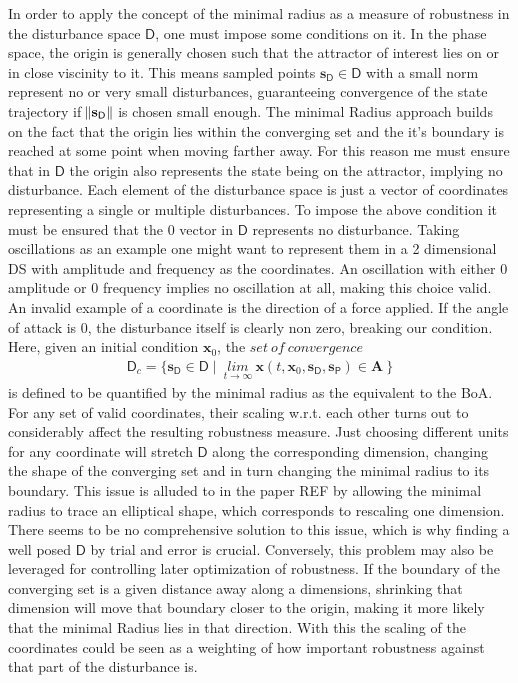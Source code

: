     In order to apply the concept of the minimal radius as a measure of robustness in the disturbance space $\mathsf{D}$, one must impose some conditions on it.
    In the phase space, the origin is generally chosen such that the attractor of interest lies on or in close viscinity to it. This means sampled points $\mathbf{s}_{\mathsf{D}} \in \mathsf{D}$ with a small norm represent no or very small disturbances, guaranteeing convergence of the state trajectory if $\norm{\mathbf{s}_{\mathsf{D}}}$ is chosen small enough. The minimal Radius approach builds on the fact that the origin lies within the converging set and the it's boundary is reached at some point when moving farther away. 
    For this reason me must ensure that in $\mathsf{D}$ the origin also represents the state being on the attractor, implying no disturbance.
    Each element of the disturbance space is just a vector of coordinates representing a single or multiple disturbances. To impose the above condition it must be ensured that the 0 vector in $\mathsf{D}$ represents no disturbance. 
    Taking oscillations as an example one might want to represent them in a 2 dimensional DS with amplitude and frequency as the coordinates. An oscillation with either 0 amplitude or 0 frequency implies no oscillation at all, making this choice valid.
    An invalid example of a coordinate is the direction of a force applied. If the angle of attack is 0, the disturbance itself is clearly non zero, breaking our condition.
    Here, given an initial condition $\mathbf{x}_0$, the $set\ of\ convergence$ 
    \begin{gather} \label{eq:9}
    \mathsf{D}_c = \{ \mathbf{s}_{\mathsf{D}} \in \mathsf{D} \mid\ \underset{t \rightarrow \infty}{lim} \ \mathbf{x}(t,\mathbf{x}_0,\mathbf{s}_{\mathsf{D}},\mathbf{s}_{\mathsf{P}}) \in \mathbf{A}\ \}\end{gather}
    is defined to be quantified by the minimal radius as the equivalent to the BoA.
    For any set of valid coordinates, their scaling w.r.t. each other turns out to considerably affect the resulting robustness measure. Just choosing different units for any coordinate will stretch $\mathsf{D}$ along the corresponding dimension, changing the shape of the converging set and in turn changing the minimal radius to its boundary. This issue is alluded to in the paper REF by allowing the minimal radius to trace an elliptical shape, which corresponds to rescaling one dimension. There seems to be no comprehensive solution to this issue, which is why finding a well posed $\mathsf{D}$ by trial and error is crucial. 
    Conversely, this problem may also be leveraged for controlling later optimization of robustness. If the boundary of the converging set is a given distance away along a dimensions, shrinking that dimension will move that boundary closer to the origin, making it more likely that the minimal Radius lies in that direction. With this the scaling of the coordinates could be seen as a weighting of how important robustness against that part of the disturbance is. 


